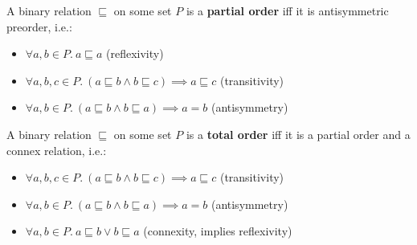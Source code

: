 %

\begin{definition}
    A binary relation $\sqsubseteq$ on some set $P$ is a \textbf{partial order} iff it is antisymmetric preorder, i.e.:
    \begin{itemize}
        \item $\forall a, b \in P.\ a \sqsubseteq a$ \tabto{7.3cm}(reflexivity)
        \item $\forall a, b, c \in P.\ (a \sqsubseteq b \wedge b \sqsubseteq c) \implies a \sqsubseteq c$ \tabto{7.3cm}(transitivity)
        \item $\forall a, b \in P.\ (a \sqsubseteq b \wedge b \sqsubseteq a) \implies a = b$ \tabto{7.3cm}(antisymmetry)
    \end{itemize}
\end{definition}

\begin{definition}
    A binary relation $\sqsubseteq$ on some set $P$ is a \textbf{total order} iff it is a partial order and a connex relation, i.e.:
    \begin{itemize}
        \item $\forall a, b, c \in P.\ (a \sqsubseteq b \wedge b \sqsubseteq c) \implies a \sqsubseteq c$ \tabto{7.3cm}(transitivity)
        \item $\forall a, b \in P.\ (a \sqsubseteq b \wedge b \sqsubseteq a) \implies a = b$ \tabto{7.3cm}(antisymmetry)
        \item $\forall a, b \in P.\ a \sqsubseteq b \vee b \sqsubseteq a$ \tabto{7.3cm}(connexity, implies reflexivity)
    \end{itemize}
\end{definition}

